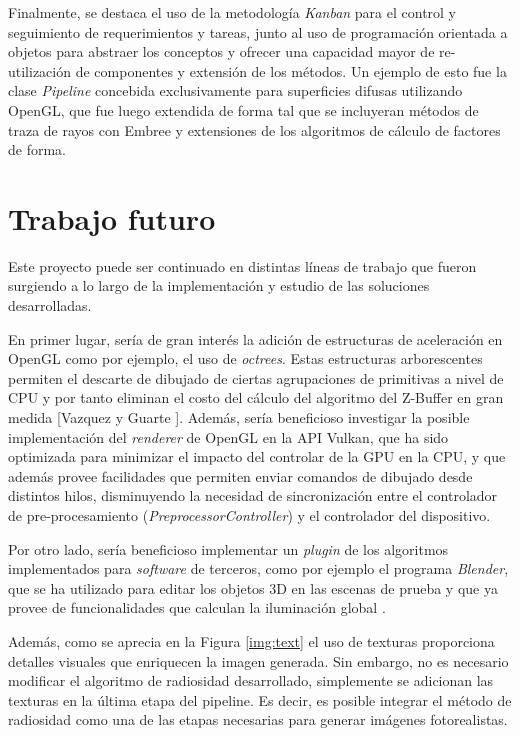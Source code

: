 Finalmente, se destaca el uso de la metodología \textit{Kanban} para el control y seguimiento de requerimientos y tareas, junto al uso de programación orientada a objetos para abstraer los conceptos y ofrecer una capacidad mayor de re-utilización de componentes y extensión de los métodos. Un ejemplo de esto fue la clase \textit{Pipeline} concebida exclusivamente para superficies difusas utilizando OpenGL, que fue luego extendida de forma tal que se incluyeran métodos de traza de rayos con Embree y extensiones de los algoritmos de cálculo de factores de forma. 

\section{Trabajo futuro}
\label{sec:futuro}

Este proyecto puede ser continuado en distintas líneas de trabajo que fueron surgiendo a lo largo de la implementación y estudio de las soluciones desarrolladas.

En primer lugar, sería de gran interés la adición de estructuras de aceleración en OpenGL como por ejemplo, el uso de \textit{octrees}. Estas estructuras arborescentes permiten el descarte de dibujado de ciertas agrupaciones de primitivas a nivel de CPU y por tanto eliminan el costo del cálculo del algoritmo del Z-Buffer en gran medida [Vazquez y Guarte \cite{Guarte}]. Además, sería beneficioso investigar la posible implementación del \textit{renderer} de OpenGL en la API Vulkan, que ha sido optimizada para minimizar el impacto del controlar de la GPU en la CPU, y que además provee facilidades que permiten enviar comandos de dibujado desde distintos hilos, disminuyendo la necesidad de sincronización entre el controlador de pre-procesamiento (\textit{PreprocessorController}) y el controlador del dispositivo.

Por otro lado, sería beneficioso implementar un \textit{plugin} de los algoritmos implementados para \textit{software} de terceros, como por ejemplo el programa \textit{Blender}, que se ha utilizado para editar los objetos 3D en las escenas de prueba y que ya provee de funcionalidades que calculan la iluminación global \cite{Blender}.

Además, como se aprecia en la Figura \ref{img:text} el uso de texturas proporciona detalles visuales que enriquecen la imagen generada. Sin embargo, no es necesario modificar el algoritmo de radiosidad desarrollado, simplemente se adicionan las texturas en la última etapa del pipeline. Es decir, es posible integrar el método de radiosidad como una de las etapas necesarias para generar imágenes fotorealistas.

